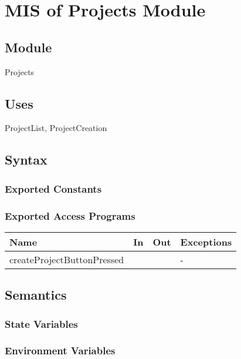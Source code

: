 \documentclass[12pt, titlepage]{article}
\begin{document}
	
	\newpage
	
	\section{MIS of Projects Module} \label{Module} 
	
	\subsection{Module}
	
	Projects
	
	\subsection{Uses}
	ProjectList, ProjectCreation
	
	\subsection{Syntax}
	
	\subsubsection{Exported Constants}
	
	\subsubsection{Exported Access Programs}
	
	\begin{center}
		\begin{tabular}{p{2cm} p{4cm} p{4cm} p{2cm}}
			\hline
			\textbf{Name} & \textbf{In} & \textbf{Out} & \textbf{Exceptions} \\
			\hline
			createProjectButtonPressed &  &  & - \\
			\hline
		\end{tabular}
	\end{center}
	
	\subsection{Semantics}
	
	\subsubsection{State Variables}
	
	
	\subsubsection{Environment Variables}
	
\end{document}
